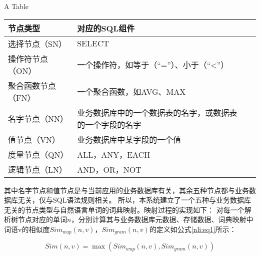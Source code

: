 \begin{table}[!hpb]
  \centering
    {A Table}
  \label{nli:jxsjddlx}
  \begin{tabular}{@{}llr@{}} \toprule
    节点类型 & 对应的SQL组件\\\midrule
    选择节点（SN） & SELECT\\
    操作符节点（ON） & 一个操作符，如等于（“=”）、小于（“<”）\\
    聚合函数节点（FN） & 一个聚合函数，如AVG、MAX\\
    名字节点（NN） & 业务数据库中的一个数据表的名字，或数据表的一个字段的名字\\
    值节点（VN） & 业务数据库中某字段的一个值\\
    度量节点（QN） & ALL，ANY，EACH\\
    逻辑节点（LN） & AND，OR，NOT\\\bottomrule

  \end{tabular}
\end{table}


其中名字节点和值节点是与当前应用的业务数据库有关，其余五种节点都与业务数据库无关，仅与SQL语法规则相关。
所以，本系统建立了一个五种与业务数据库无关的节点类型与自然语言单词的词典映射。映射过程的实现如下：
对每一个解析树节点对应的单词$n$，分别计算其与业务数据库元数据、存储数据、词典映射中词语v的相似度$Sim_{wup}(n,v)$，$Sim_{gram}(n,v)$的定义如公式\ref{nli:eq1}所示：

  \begin{equation}
    \label{nli:eq1}
    Sim(n,v) = \max(Sim_{wup}(n,v),Sim_{gram}(n,v))
\end{equation}

